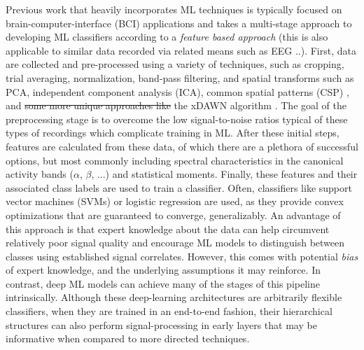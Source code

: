 \documentclass[utf8]{frontiersSCNS} %
\begin{document}
Previous work that heavily incorporates ML techniques is typically focused on brain-computer-interface (BCI) applications and takes a multi-stage approach to developing ML classifiers according to a \emph{feature based approach} (this is also applicable to similar data recorded via related means such as EEG ..). First, data are collected and pre-processed using a variety of techniques, such as cropping, trial averaging, normalization, band-pass filtering, and spatial transforms such as PCA, independent component analysis (ICA), common spatial patterns (CSP) \cite{Muller-Gerking1999}, and \st{some more unique approaches like} the xDAWN algorithm \cite{Rivet2009}. The goal of the preprocessing stage is to overcome the low signal-to-noise ratios typical of these types of recordings which complicate training in ML. After these initial steps, features are calculated from these data, of which there are a plethora of successful options, but most commonly including spectral characteristics in the canonical activity bands ($\alpha$, $\beta$, ...) and statistical moments. Finally, these features and their associated class labels are used to train a classifier. Often, classifiers like support vector machines (SVMs) or logistic regression are used, as they provide convex optimizations that are guaranteed to converge, generalizably. An advantage of this approach is that expert knowledge about the data can help circumvent relatively poor signal quality and encourage ML models to distinguish between classes using established signal correlates. However, this comes with potential \emph{bias} of expert knowledge, and the underlying assumptions it may reinforce. In contrast, deep ML models can achieve many of the stages of this pipeline intrinsically. Although these deep-learning architectures are arbitrarily flexible classifiers, when they are trained in an end-to-end fashion, their hierarchical structures can also perform signal-processing in early layers that may be informative when compared to more directed techniques.

\end{document}
